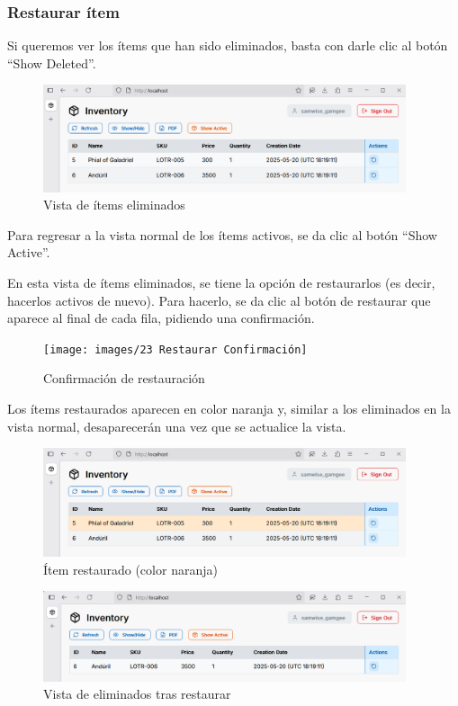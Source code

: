 \subsubsection{Restaurar ítem}

Si queremos ver los ítems que han sido eliminados, basta con darle clic al botón “Show Deleted”.

\begin{figure}[H]
    \centering
    \includegraphics[width=0.95\textwidth]{images/22 Eliminados}
    \caption{Vista de ítems eliminados}
\end{figure}

Para regresar a la vista normal de los ítems activos, se da clic al botón “Show Active”.

En esta vista de ítems eliminados, se tiene la opción de restaurarlos (es decir, hacerlos activos de nuevo). Para hacerlo, se da clic al botón de restaurar que aparece al final de cada fila, pidiendo una confirmación.

\begin{figure}[H]
    \centering
    \texttt{[image: images/23 Restaurar Confirmación]}
    \caption{Confirmación de restauración}
\end{figure}

Los ítems restaurados aparecen en color naranja y, similar a los eliminados en la vista normal, desaparecerán una vez que se actualice la vista.

\begin{figure}[H]
    \centering
    \includegraphics[width=0.95\textwidth]{images/24 Restaurado}
    \caption{Ítem restaurado (color naranja)}
\end{figure}
\begin{figure}[H]
    \centering
    \includegraphics[width=0.95\textwidth]{images/25 Eliminados Actualizado}
    \caption{Vista de eliminados tras restaurar}
\end{figure}
